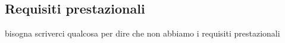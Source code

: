 \subsection{Requisiti prestazionali}

%
%	
%	
%
bisogna scriverci qualcosa per dire che non abbiamo i requisiti prestazionali
